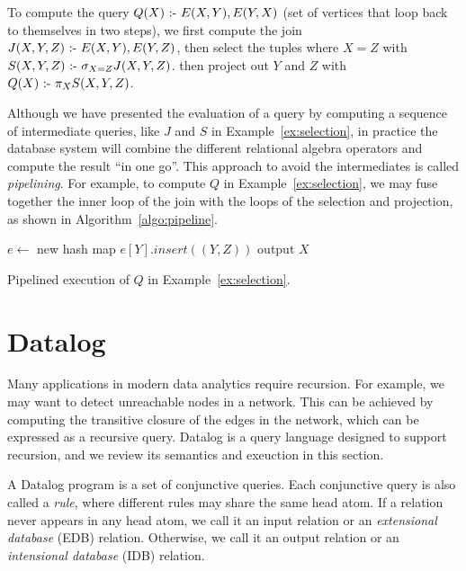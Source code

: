 \begin{ex}
\label{ex:selection}
To compute the query $Q(X) \text{ :- } E(X, Y), E(Y, X)$ 
 (set of vertices that loop back to themselves in two steps),
 we first compute the join $J(X, Y, Z) \text{ :- } E(X, Y), E(Y, Z)$, 
 then select the tuples where $X = Z$ with $S(X, Y, Z) \text{ :- } \sigma_{X=Z} J(X, Y, Z)$.
 then project out $Y$ and $Z$ with $Q(X) \text{ :- } \pi_{X} S(X, Y, Z)$.
\end{ex}
 
Although we have presented the evaluation of a query 
 by computing a sequence of intermediate queries, 
 like $J$ and $S$ in Example~\ref{ex:selection},
 in practice the database system will combine
 the different relational algebra operators 
 and compute the result ``in one go''.
This approach to avoid the intermediates 
 is called {\em pipelining}.
For example, to compute $Q$ in Example~\ref{ex:selection},
 we may fuse together the inner loop of the join
 with the loops of the selection and projection, 
 as shown in Algorithm~\ref{algo:pipeline}.

\begin{algorithm}
$e \gets $ new hash map \;
{
    $e[Y].insert((Y, Z))$\;
}
{
    {
        {
            output $X$\;
        }
    }
}
\caption{Pipelined execution of $Q$ in Example~\ref{ex:selection}.}
\label{algo:pipeline} 
\end{algorithm}

\section{Datalog}
\label{sec:datalog}

Many applications in modern data analytics require recursion.
For example, we may want to detect unreachable nodes in a network.
This can be achieved by computing the transitive closure 
 of the edges in the network,
 which can be expressed as a recursive query.
Datalog is a query language designed to support recursion, 
 and we review its semantics and exeuction in this section.

A Datalog program is a set of conjunctive queries.
Each conjunctive query is also called a {\em rule}, 
 where different rules may share the same head atom. 
If a relation never appears in any head atom,
 we call it an input relation or an {\em extensional database} (EDB) relation.
Otherwise, we call it an output relation or an {\em intensional database} (IDB) relation.

